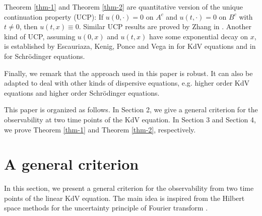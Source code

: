 \documentclass[preprint,12pt]{elsarticle}
\begin{document}
Theorem \ref{thm-1} and Theorem \ref{thm-2} are quantitative version of the unique continuation property (UCP): If $u(0,\cdot)=0$ on $A^c$ and $u(t,\cdot)=0$ on $B^c$ with $t\neq 0$, then $u(t,x)\equiv 0$. Similar UCP results are proved by Zhang in \cite{zhang-kdv,zhang-sch}. Another kind of UCP, assuming $u(0,x)$ and $u(t,x)$ have some exponential decay on $x$, is established by Escauriaza,   Kenig, Ponce and Vega in \cite{EKPV-kdv} for KdV equations and in \cite{EKPV12} for Schr\"{o}dinger equations.

Finally, we remark that the approach used in this paper is robust. It can also be adapted to deal with other kinds of dispersive equations, e.g. higher order KdV equations and higher order Schr\"{o}dinger equations.

This paper is organized as follows. In Section 2, we give a general criterion for the observability at two time points of the KdV equation. In Section 3 and Section 4, we prove Theorem \ref{thm-1} and Theorem \ref{thm-2}, respectively.


\section{A general criterion}

In this section, we present a general criterion for the observability from two time points of the linear KdV equation. The main idea is inspired from the Hilbert space methods for the uncertainty principle of Fourier transform \cite[Part One, Chap. 3]{Havin}.
\end{document}
